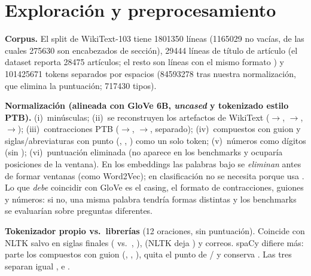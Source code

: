 \section{Exploración y preprocesamiento}
\textbf{Corpus.} El split  de WikiText-103 tiene \num{1801350} líneas (\num{1165029} no vacías, de las cuales
\num{275630} son encabezados de sección), \num{29444} líneas de título de artículo (el dataset reporta \num{28475}
artículos; el resto son líneas con el mismo formato ) y \num{101425671} tokens separados por espacios
(\num{84593278} tras nuestra normalización, que elimina la puntuación; \num{717430} tipos).

\textbf{Normalización (alineada con GloVe 6B, \emph{uncased} y tokenizado estilo PTB).}
(i)~minúsculas; (ii)~se reconstruyen los artefactos de WikiText ($\to$,
$\to$, $\to$); (iii)~contracciones PTB ($\to$,
$\to$,  separado); (iv)~compuestos con guion y siglas/abreviaturas con punto
(, , ) como un solo token; (v)~números como dígitos (sin ); (vi)~puntuación
eliminada (no aparece en los benchmarks y ocuparía posiciones de la ventana). En los embeddings las palabras bajo
 se \emph{eliminan} antes de formar ventanas (como Word2Vec); en clasificación no se necesita 
porque  usa . Lo que \emph{debe} coincidir con GloVe es el casing, el formato de contracciones,
guiones y números: si no, una misma palabra tendría formas distintas y los benchmarks se evaluarían sobre preguntas diferentes.

\textbf{Tokenizador propio vs.\ librerías} (12 oraciones, sin puntuación). Coincide con NLTK salvo en siglas finales
( vs.\ , ),  (NLTK deja ) y correos. spaCy difiere más: parte los
compuestos con guion (, , ), quita el punto de /
y conserva . Las tres separan igual ,  e .
